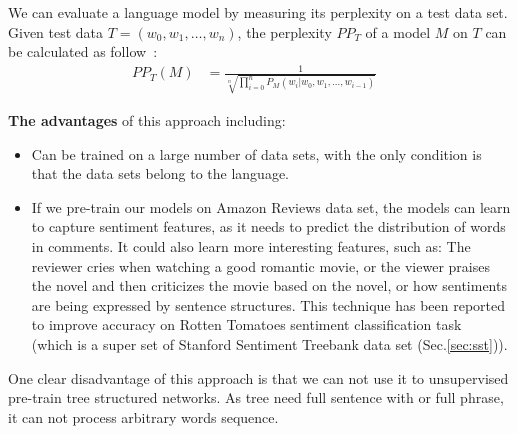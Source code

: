 We can evaluate a language model by measuring its perplexity on a test data set. Given test data \(T = (w_0, w_1,\ldots,w_n)\), the perplexity \(PP_T\) of a model \(M\) on \(T\) can be calculated as follow~\cite{perplexity}:
\begin{align}
    PP_T(M) &= \frac{1}{\sqrt[n]{\prod_{i=0}^{n} P_M(w_{i}|w_0, w_1,\ldots,w_{i-1})}}&
\end{align}

\label{lm-hypothesis}
\textbf{The advantages} of this approach including:
\begin{itemize}
\item Can be trained on a large number of data sets, with the only condition is that the data sets belong to the language.
\label{unproved:unsupervised-good}
\item If we pre-train our models on Amazon Reviews data set, the models can learn to capture sentiment features, as it needs to predict the distribution of words in comments.
It could also learn more interesting features, such as: 
The reviewer cries when watching a good romantic movie, or the viewer praises the novel and then criticizes the movie based on the novel, or how sentiments are being expressed by sentence structures. 
This technique has been reported to improve accuracy on Rotten Tomatoes sentiment classification task~\cite{Rotten-Tomato} (which is a super set of Stanford Sentiment Treebank data set (Sec.\ref{sec:sst})).
\end{itemize}

One clear disadvantage of this approach is that we can not use it to unsupervised pre-train tree structured networks. 
As tree need full sentence with or full phrase, it can not process arbitrary words sequence. 

